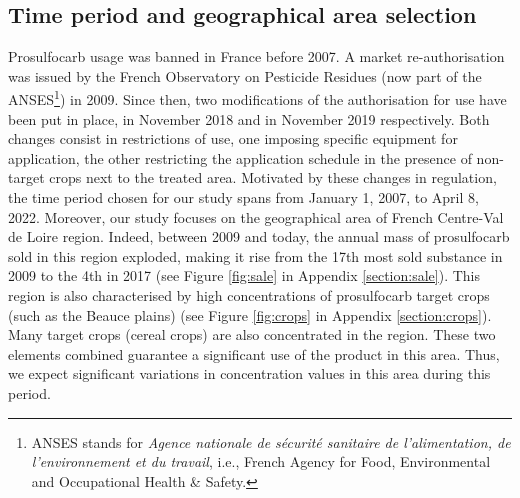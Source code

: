\subsection{Time period and geographical area selection}
\label{section:data-naiade}
Prosulfocarb usage was banned in France before 2007. A market re-authorisation was issued by the French Observatory on Pesticide Residues (now part of the ANSES\footnote{ANSES stands for \emph{Agence nationale de sécurité sanitaire de l’alimentation, de l’environnement et du travail}, i.e., French Agency for Food, Environmental and Occupational Health \& Safety.}) in 2009.
Since then, two modifications of the authorisation for use have been put in place, in November 2018 and in November 2019 respectively. Both changes consist in restrictions of use, one imposing specific equipment for application, the other restricting the application schedule in the presence of non-target crops next to the treated area. Motivated by these changes in regulation, the time period chosen for our study spans from January 1, 2007, to April 8, 2022.
Moreover, our study focuses on the geographical area of French Centre-Val de Loire region. Indeed, between 2009 and today, the annual mass of prosulfocarb sold in this region  exploded, making it rise from the 17th most sold substance in 2009 to the 4th in 2017 (see Figure \ref{fig:sale} in Appendix \ref{section:sale}). This region is also characterised by high concentrations of prosulfocarb target crops (such as the Beauce plains) (see Figure \ref{fig:crops} in Appendix \ref{section:crops}). 
Many target crops (cereal crops) are also concentrated in the region. These two elements combined guarantee a significant use of the product in this area.  
Thus, we expect significant variations in concentration values in this area during this period. 

